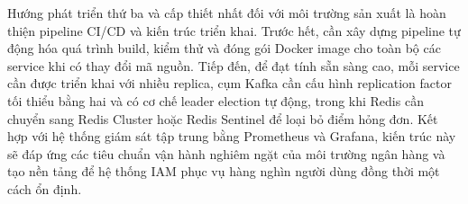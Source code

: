 \documentclass[../DoAn.tex]{subfiles}
\begin{document}
Hướng phát triển thứ ba và cấp thiết nhất đối với môi trường sản xuất là hoàn thiện pipeline CI/CD và kiến trúc triển khai. Trước hết, cần xây dựng pipeline tự động hóa quá trình build, kiểm thử và đóng gói Docker image cho toàn bộ các service khi có thay đổi mã nguồn. Tiếp đến, để đạt tính sẵn sàng cao, mỗi service cần được triển khai với nhiều replica, cụm Kafka cần cấu hình replication factor tối thiểu bằng hai và có cơ chế leader election tự động, trong khi Redis cần chuyển sang Redis Cluster hoặc Redis Sentinel để loại bỏ điểm hỏng đơn. Kết hợp với hệ thống giám sát tập trung bằng Prometheus và Grafana, kiến trúc này sẽ đáp ứng các tiêu chuẩn vận hành nghiêm ngặt của môi trường ngân hàng và tạo nền tảng để hệ thống IAM phục vụ hàng nghìn người dùng đồng thời một cách ổn định.
\end{document}
